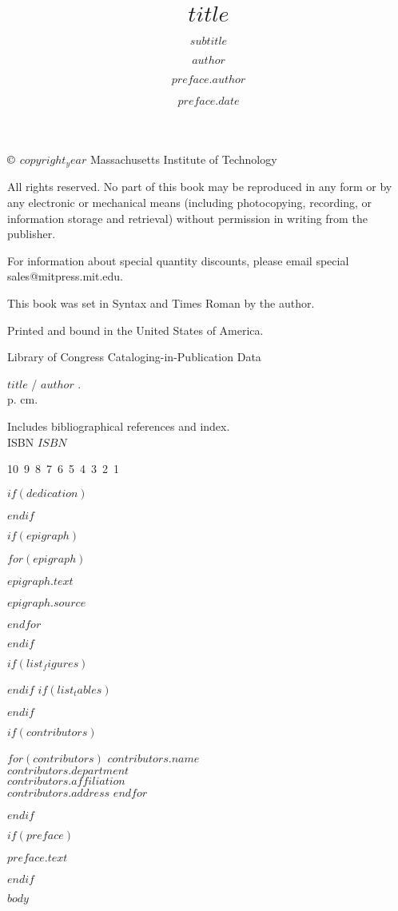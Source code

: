 \documentclass[$class_options$]{Linguistics}
\title{$title$}
\subtitle{$subtitle$}
\author{$author$}
\begin{document}
\halftitlepage

\titlepage

\begin{copyrightpage}

	\(\copyright\) $copyright_year$ Massachusetts Institute of Technology

	All rights reserved. No part of this book may be reproduced in
        any form or by any electronic or mechanical means (including
        photocopying, recording, or information storage and retrieval) without
        permission in writing from the publisher.

	For information about special quantity discounts, please email special sales@mitpress.mit.edu.

	This book was set in Syntax and Times Roman by the author.

	Printed and bound in the United States of America.

	Library of Congress Cataloging-in-Publication Data

	$title$ / $author$ .\\
	\hspace*{6pt} p. cm.

	Includes bibliographical references and index.\\
	ISBN $ISBN$
\vfill

10\ 9\ 8\ 7\ 6\ 5\ 4\ 3\ 2\ 1\

\end{copyrightpage}

$if(dedication)$
\dedication{$dedication$}
$endif$

$if(epigraph)$
  \begin{epigraphpage}
  $for(epigraph)$
    \epigraph{$epigraph.text$}{$epigraph.source$}
  $endfor$
  \end{epigraphpage}
$endif$

\tableofcontents
$if(list_figures)$\listoffigures$endif$
$if(list_tables)$\listoftables$endif$

$if(contributors)$
  \begin{contributors}
  $for(contributors)$
    \contrib
    $contributors.name$\\
    $contributors.department$\\
    $contributors.affiliation$\\
    $contributors.address$
  $endfor$
  \end{contributors}
$endif$

$if(preface)$
\begin{preface}
  $preface.text$
  \author{$preface.author$}
  \date{$preface.date$}
\end{preface}
$endif$

$body$

\endmatter



\end{document}
